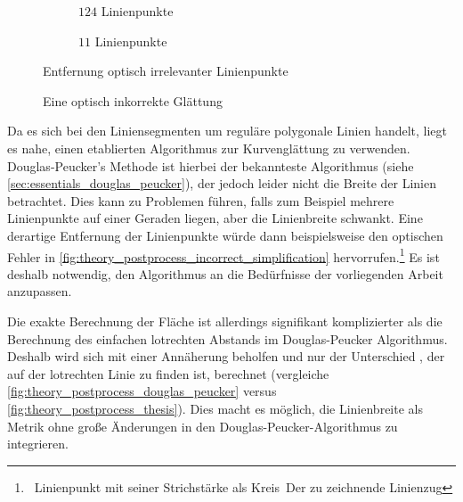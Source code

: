 \begin{figure}[ht]
    \begin{subfigure}[t]{0.45\textwidth}
        \centering
        
        \caption{\(124\) Linienpunkte}
    \end{subfigure}
    \hfill
    \begin{subfigure}[t]{0.45\textwidth}
        \centering
        
        \caption{\(11\) Linienpunkte}
    \end{subfigure}
    \caption{Entfernung optisch irrelevanter Linienpunkte}%
    \label{fig:theory_postprocess_simplification}
\end{figure}

\wrapfigurefix{2bp}
\begin{figure}
    \centering
    
    \caption{Eine optisch inkorrekte Glättung}%
    \label{fig:theory_postprocess_incorrect_simplification}
\end{figure}
Da es sich bei den Liniensegmenten um reguläre polygonale Linien handelt, liegt es nahe, einen etablierten Algorithmus zur Kurvenglättung zu verwenden.
Douglas-Peucker's Methode ist hierbei der bekannteste Algorithmus (siehe \autoref{sec:essentials_douglas_peucker}), der jedoch leider nicht die Breite der Linien betrachtet.
Dies kann zu Problemen führen, falls zum Beispiel mehrere Linienpunkte auf einer Geraden liegen, aber die Linienbreite schwankt.
Eine derartige Entfernung der Linienpunkte würde dann beispielsweise den optischen Fehler \textcolor{gray}{} in \autoref{fig:theory_postprocess_incorrect_simplification} hervorrufen.\footnote{~Linienpunkt mit seiner Strichstärke als Kreis\enskip\textcolor{gray}{}~Der zu zeichnende Linienzug}
Es ist deshalb notwendig, den Algorithmus an die Bedürfnisse der vorliegenden Arbeit anzupassen.
\wrapfigureunfix{}

Die exakte Berechnung der Fläche \textcolor{gray}{} ist allerdings signifikant komplizierter als die Berechnung des einfachen lotrechten Abstands im Douglas-Peucker Algorithmus.
Deshalb wird sich mit einer Annäherung beholfen und nur der Unterschied \textcolor{gray}{}, der auf der lotrechten Linie zu finden ist, berechnet (vergleiche \autoref{fig:theory_postprocess_douglas_peucker} versus \autoref{fig:theory_postprocess_thesis}).
Dies macht es möglich, die Linienbreite als Metrik ohne große Änderungen in den Douglas-Peucker-Algorithmus zu integrieren.

